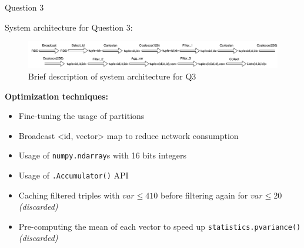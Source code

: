 \begin{block}{Question 3}

System architecture for Question 3:

\begin{figure}[!h]
    \centering
    \includegraphics[width=.95\linewidth]{../assets/images/q3_diagram.png}
    \caption{Brief description of system architecture for Q3}
    \label{fig:q3_diagram}
\end{figure}

\textbf{Optimization techniques:}

\begin{itemize}
    \item Fine-tuning the usage of partitions
    \item Broadcast <id, vector> map to reduce network consumption
    \item Usage of \texttt{numpy.ndarray}s with 16 bits integers
    \item Usage of \texttt{.Accumulator()} API 
    \item Caching filtered triples with $var \le 410$ before filtering again for $var \le 20$ \emph{(discarded)}
    \item Pre-computing the mean of each vector to speed up \texttt{statistics.pvariance()} \emph{(discarded)}
\end{itemize}

\begin{columns}
    \begin{column}{.5\textwidth}
        \begin{table}[!h]
            \centering
            
        \end{table}
    \end{column}
    
    \begin{column}{.5\textwidth}
        \begin{table}[!h]
            \centering
            
        \end{table}
    \end{column}
\end{columns}
    
\end{block}